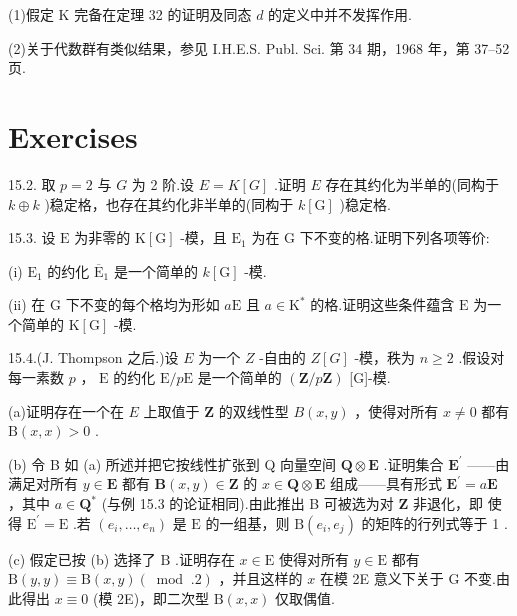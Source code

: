 \documentclass[10pt]{article}
\begin{document}
(1)假定 \(\mathrm{K}\) 完备在定理 32 的证明及同态 \(d\) 的定义中并不发挥作用.

(2)关于代数群有类似结果，参见 I.H.E.S. Publ. Sci. 第 34 期，1968 年，第 37–52 页.

\section*{Exercises}

15.2. 取 \(p = 2\) 与 \(G\) 为 2 阶.设 \(E = K\left\lbrack  G\right\rbrack\) .证明 \(E\) 存在其约化为半单的(同构于 \(k \oplus  k\) )稳定格，也存在其约化非半单的(同构于 \(k\left\lbrack  \mathrm{G}\right\rbrack\) )稳定格.

15.3. 设 \(\mathrm{E}\) 为非零的 \(\mathrm{K}\left\lbrack  \mathrm{G}\right\rbrack\) -模，且 \({\mathrm{E}}_{1}\) 为在 \(\mathrm{G}\) 下不变的格.证明下列各项等价:

(i) \({\mathrm{E}}_{1}\) 的约化 \({\overline{\mathrm{E}}}_{1}\) 是一个简单的 \(k\left\lbrack  \mathrm{G}\right\rbrack\) -模.

(ii) 在 \(\mathrm{G}\) 下不变的每个格均为形如 \(a\mathrm{E}\) 且 \(a \in  {\mathrm{K}}^{ * }\) 的格.证明这些条件蕴含 \(\mathrm{E}\) 为一个简单的 \(\mathrm{K}\left\lbrack  \mathrm{G}\right\rbrack\) -模.

15.4.(J. Thompson 之后.)设 \(E\) 为一个 \(Z\) -自由的 \(Z\left\lbrack  G\right\rbrack\) -模，秩为 \(n \geq  2\) .假设对每一素数 \(p\) ， \(\mathrm{E}\) 的约化 \(\mathrm{E}/p\mathrm{E}\) 是一个简单的 \(\left( {\mathbf{Z}/p\mathbf{Z}}\right)\) [G]-模.

(a)证明存在一个在 \(E\) 上取值于 \(\mathbf{Z}\) 的双线性型 \(B\left( {x,y}\right)\) ，使得对所有 \(x \neq  0\) 都有 \(\mathrm{B}\left( {x,x}\right)  > 0\) .

(b) 令 B 如 (a) 所述并把它按线性扩张到 Q 向量空间 \(\mathbf{Q} \otimes  \mathbf{E}\) .证明集合 \({\mathbf{E}}^{\prime }\) ——由满足对所有 \(y \in  \mathbf{E}\) 都有 \(\mathbf{B}\left( {x,y}\right)  \in  \mathbf{Z}\) 的 \(x \in  \mathbf{Q} \otimes  \mathbf{E}\) 组成——具有形式 \({\mathbf{E}}^{\prime } = a\mathbf{E}\) ，其中 \(a \in  {\mathbf{Q}}^{ * }\) (与例 15.3 的论证相同).由此推出 B 可被选为对 \(\mathbf{Z}\) 非退化，即 使得 \({\mathrm{E}}^{\prime } = \mathrm{E}\) .若 \(\left( {{e}_{i},\ldots ,{e}_{n}}\right)\) 是 \(\mathrm{E}\) 的一组基，则 \(\mathrm{B}\left( {{e}_{i},{e}_{j}}\right)\) 的矩阵的行列式等于 1 .

(c) 假定已按 (b) 选择了 \(\mathrm{B}\) .证明存在 \(x \in  \mathrm{E}\) 使得对所有 \(y \in  \mathrm{E}\) 都有 \(\mathrm{B}\left( {y,y}\right)  \equiv  \mathrm{B}\left( {x,y}\right) \left( {\;\operatorname{mod}\;{.2}}\right)\) ，并且这样的 \(x\) 在模 2E 意义下关于 G 不变.由此得出 \(x \equiv  0\) (模 2E)，即二次型 \(\mathrm{B}\left( {x,x}\right)\) 仅取偶值.
\end{document}
